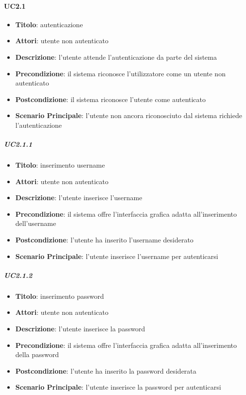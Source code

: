 	\paragraph{UC2.1}
		\begin{itemize}
			\item \textbf{Titolo}: autenticazione
			\item \textbf{Attori}: utente non autenticato
			\item \textbf{Descrizione}: l'utente attende l'autenticazione da parte del sistema
			\item \textbf{Precondizione}: il sistema riconosce l'utilizzatore come un utente non autenticato
			\item \textbf{Postcondizione}: il sistema riconosce l'utente come autenticato
			\item \textbf{Scenario Principale}: l’utente non ancora riconosciuto dal sistema richiede l'autenticazione
	\end{itemize}
		\subparagraph{UC2.1.1}
			\begin{itemize}
			\item \textbf{Titolo}: inserimento username
			\item \textbf{Attori}: utente non autenticato
			\item \textbf{Descrizione}: l'utente inserisce l'username
			\item \textbf{Precondizione}: il sistema offre l'interfaccia grafica adatta all'inserimento dell'username
			\item \textbf{Postcondizione}: l'utente ha inserito l'username desiderato
			\item \textbf{Scenario Principale}: l'utente inserisce l'username per autenticarsi
		\end{itemize}
		\subparagraph{UC2.1.2}
			\begin{itemize}
			\item \textbf{Titolo}: inserimento password
			\item \textbf{Attori}: utente non autenticato
			\item \textbf{Descrizione}: l'utente inserisce la password
			\item \textbf{Precondizione}: il sistema offre l'interfaccia grafica adatta all'inserimento della password
			\item \textbf{Postcondizione}: l'utente ha inserito la password desiderata
			\item \textbf{Scenario Principale}: l'utente inserisce la password per autenticarsi
		\end{itemize}
